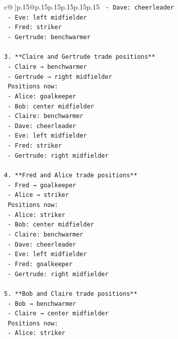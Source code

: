 \documentclass{article}
\begin{document}
{\begin{supertabular}{c@{$\;$}|p{.15\linewidth}@{}p{.15\linewidth}p{.15\linewidth}p{.15\linewidth}p{.15\linewidth}p{.15\linewidth}}
{{{\texttt{   {-} Dave: cheerleader  } \\
\texttt{   {-} Eve: left midfielder  } \\
\texttt{   {-} Fred: striker  } \\
\texttt{   {-} Gertrude: benchwarmer  } \\
\\ 
\texttt{3. **Claire and Gertrude trade positions**  } \\
\texttt{   {-} Claire → benchwarmer  } \\
\texttt{   {-} Gertrude → right midfielder  } \\
\texttt{   Positions now:  } \\
\texttt{   {-} Alice: goalkeeper  } \\
\texttt{   {-} Bob: center midfielder  } \\
\texttt{   {-} Claire: benchwarmer  } \\
\texttt{   {-} Dave: cheerleader  } \\
\texttt{   {-} Eve: left midfielder  } \\
\texttt{   {-} Fred: striker  } \\
\texttt{   {-} Gertrude: right midfielder  } \\
\\ 
\texttt{4. **Fred and Alice trade positions**  } \\
\texttt{   {-} Fred → goalkeeper  } \\
\texttt{   {-} Alice → striker  } \\
\texttt{   Positions now:  } \\
\texttt{   {-} Alice: striker  } \\
\texttt{   {-} Bob: center midfielder  } \\
\texttt{   {-} Claire: benchwarmer  } \\
\texttt{   {-} Dave: cheerleader  } \\
\texttt{   {-} Eve: left midfielder  } \\
\texttt{   {-} Fred: goalkeeper  } \\
\texttt{   {-} Gertrude: right midfielder  } \\
\\ 
\texttt{5. **Bob and Claire trade positions**  } \\
\texttt{   {-} Bob → benchwarmer  } \\
\texttt{   {-} Claire → center midfielder  } \\
\texttt{   Positions now:  } \\
\texttt{   {-} Alice: striker  } \\
}}}
\end{supertabular}}
\end{document}

